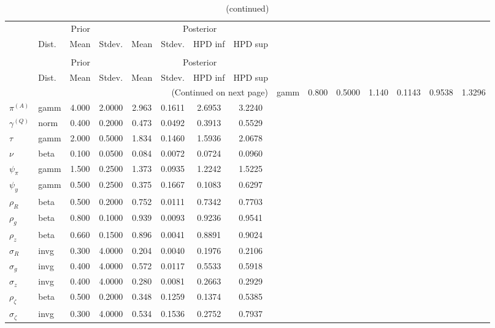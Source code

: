  
\begin{center}
\begin{longtable}{llcccccc} 
\caption{Results from Metropolis-Hastings (parameters)}
 \label{Table:MHPosterior:1}\\
\toprule 
  & \multicolumn{3}{c}{Prior}  &  \multicolumn{4}{c}{Posterior} \\
  \cmidrule(r{.75em}){2-4} \cmidrule(r{.75em}){5-8}
  & Dist. & Mean  & Stdev. & Mean & Stdev. & HPD inf & HPD sup\\
\midrule \endfirsthead 
\caption{(continued)}\\\toprule 
  & \multicolumn{3}{c}{Prior}  &  \multicolumn{4}{c}{Posterior} \\
  \cmidrule(r{.75em}){2-4} \cmidrule(r{.75em}){5-8}
  & Dist. & Mean  & Stdev. & Mean & Stdev. & HPD inf & HPD sup\\
\midrule \endhead 
\bottomrule \multicolumn{8}{r}{(Continued on next page)} \endfoot 
\bottomrule \endlastfoot 
${r_{A}}$ & gamm &   0.800 & 0.5000 &   1.140& 0.1143 &  0.9538 &  1.3296 \\ 
${\pi^{(A)}}$ & gamm &   4.000 & 2.0000 &   2.963& 0.1611 &  2.6953 &  3.2240 \\ 
${\gamma^{(Q)}}$ & norm &   0.400 & 0.2000 &   0.473& 0.0492 &  0.3913 &  0.5529 \\ 
${\tau}$ & gamm &   2.000 & 0.5000 &   1.834& 0.1460 &  1.5936 &  2.0678 \\ 
${\nu}$ & beta &   0.100 & 0.0500 &   0.084& 0.0072 &  0.0724 &  0.0960 \\ 
${\psi_\pi}$ & gamm &   1.500 & 0.2500 &   1.373& 0.0935 &  1.2242 &  1.5225 \\ 
${\psi_y}$ & gamm &   0.500 & 0.2500 &   0.375& 0.1667 &  0.1083 &  0.6297 \\ 
${\rho_R}$ & beta &   0.500 & 0.2000 &   0.752& 0.0111 &  0.7342 &  0.7703 \\ 
${\rho_{g}}$ & beta &   0.800 & 0.1000 &   0.939& 0.0093 &  0.9236 &  0.9541 \\ 
${\rho_z}$ & beta &   0.660 & 0.1500 &   0.896& 0.0041 &  0.8891 &  0.9024 \\ 
${\sigma_R}$ & invg &   0.300 & 4.0000 &   0.204& 0.0040 &  0.1976 &  0.2106 \\ 
${\sigma_{g}}$ & invg &   0.400 & 4.0000 &   0.572& 0.0117 &  0.5533 &  0.5918 \\ 
${\sigma_z}$ & invg &   0.400 & 4.0000 &   0.280& 0.0081 &  0.2663 &  0.2929 \\ 
${\rho_\zeta}$ & beta &   0.500 & 0.2000 &   0.348& 0.1259 &  0.1374 &  0.5385 \\ 
${\sigma_\zeta}$ & invg &   0.300 & 4.0000 &   0.534& 0.1536 &  0.2752 &  0.7937 \\ 
\end{longtable}
 \end{center}
